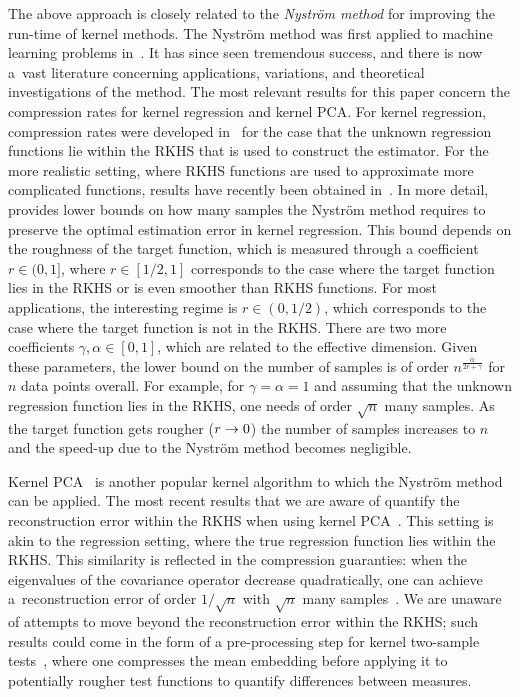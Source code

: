 \documentclass[10pt]{amsart}
\theoremstyle{definition}\newtheorem{defi}[theo]{Definition}\newtheorem{rema}[theo]{Remark}\newtheorem{exam}[theo]{Example}\newtheorem{exem}[theo]{Example}\newtheorem{nota}[theo]{Notation}
\theoremstyle{remark}
\renewcommand*{\to}{\mathchoice{\longrightarrow}{\rightarrow}{\rightarrow}{\rightarrow}}
\newcounter{setofstep}
\newcounter{step}[setofstep]
\begin{document}
The above approach is closely related to the \emph{Nystr\"om method} for improving the run-time of kernel methods. The Nystr\"om method was first applied to machine learning problems in~\cite{SEEG00}. It has since seen tremendous success, and there is now a~vast literature concerning applications, variations, and theoretical investigations of the method. The most relevant results for this paper concern the compression rates for kernel regression and kernel PCA. For kernel regression, compression rates were developed in~\cite{RUDI15} for the case that the unknown regression functions lie within the RKHS that is used to construct the estimator. For the more realistic setting, where RKHS functions are used to approximate more complicated functions, results have recently been obtained in~\cite{LI23}. In more detail, \cite[Theorem~3.9]{LI23} provides lower bounds on how many samples the Nystr\"om method requires to preserve the optimal estimation error in kernel regression. This bound depends on the roughness of the target function, which is measured through a coefficient $r \in (0,1]$, where $r \in [1/2,1]$ corresponds to the case where the target function lies in the RKHS or is even smoother than RKHS functions. For most applications, the interesting regime is $r \in (0,1/2)$, which corresponds to the case where the target function is not in the RKHS. There are two more coefficients $\gamma, \alpha \in [0,1]$, which are related to the effective dimension. Given these parameters, the lower bound on the number of samples is of order $n^{\frac{\alpha}{2r + \gamma}}$ for $n$ data points overall. For example, for $\gamma = \alpha =1$ and assuming that the unknown regression function lies in the RKHS, one needs of order $\sqrt{n}$ many samples. As the target function gets rougher ($r \to 0$) the number of samples increases to $n$ and the speed-up due to the Nystr\"om method becomes negligible.

Kernel PCA~\cite{SCH97,BLAN07} is another popular kernel algorithm to which the Nystr\"om method can be applied. The most recent results that we are aware of quantify the reconstruction error within the RKHS when using kernel PCA~\cite{STER20}. This setting is akin to the regression setting, where the true regression function lies within the RKHS. This similarity is reflected in the compression guaranties: when the eigenvalues of the covariance operator decrease quadratically, one can achieve a~reconstruction error of order $1/\sqrt{n}$ with $\sqrt{n}$ many samples~\cite[Corollary~3]{STER20}. We are unaware of attempts to move beyond the reconstruction error within the RKHS; such results could come in the form of a pre-processing step for kernel two-sample tests~\cite{GRET12}, where one compresses the mean embedding before applying it to potentially rougher test functions to quantify differences between measures.
\end{document}
